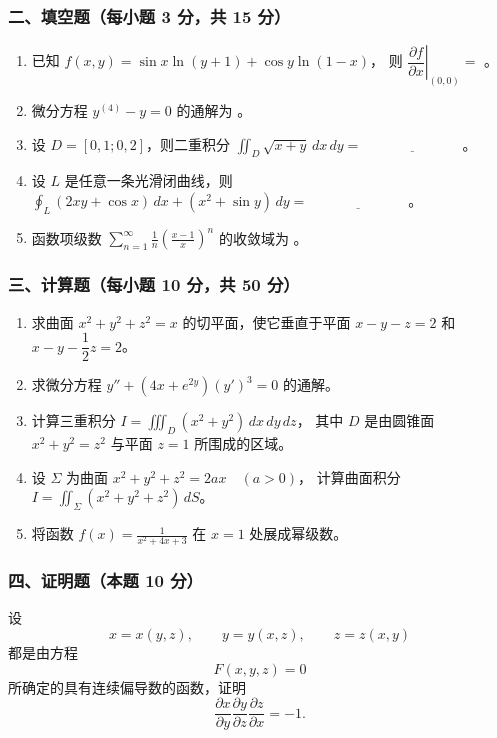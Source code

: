 \subsubsection*{二、填空题（每小题 3 分，共 15 分）}
\begin{enumerate}
  \item 已知 \(\displaystyle f(x,y)=\sin x\ln(y+1)+\cos y\ln(1-x)\)，
  则 $\left.\dfrac{\partial f}{\partial x}\right|_{(0,0)}=$ \underline{\hspace{3cm}}。
  \item 微分方程 \(\displaystyle y^{(4)}-y=0\)
  的通解为 \underline{\hspace{4cm}}。
  \item 设 $D=[0,1;0,2]$，则二重积分
  \(\displaystyle \iint_D\sqrt{x+y}\,dx\,dy=\underline{\hspace{3cm}}\)。
  \item 设 $L$ 是任意一条光滑闭曲线，则
  \(\displaystyle \oint_L(2xy+\cos x)\,dx+(x^2+\sin y)\,dy=\underline{\hspace{3cm}}\)。
  \item 函数项级数 \(\displaystyle \sum_{n=1}^{\infty}\frac1n\left(\frac{x-1}{x}\right)^n\)
  的收敛域为 \underline{\hspace{4cm}}。
\end{enumerate}

\subsubsection*{三、计算题（每小题 10 分，共 50 分）}
\begin{enumerate}
  \item 求曲面 \(\displaystyle x^2+y^2+z^2=x\)
  的切平面，使它垂直于平面 $x-y-z=2$ 和 $x-y-\dfrac12z=2$。
  \item 求微分方程 \(\displaystyle y''+(4x+e^{2y})(y')^3=0\)
  的通解。
  \item 计算三重积分 \(\displaystyle I=\iiint_D(x^2+y^2)\,dx\,dy\,dz\)，
  其中 $D$ 是由圆锥面 $x^2+y^2=z^2$ 与平面 $z=1$ 所围成的区域。
  \item 设 $\Sigma$ 为曲面 \(\displaystyle x^2+y^2+z^2=2ax\quad(a>0)\)，
  计算曲面积分 \(\displaystyle I=\iint_\Sigma(x^2+y^2+z^2)\,dS\)。
  \item 将函数 \(\displaystyle f(x)=\frac1{x^2+4x+3}\)
  在 $x=1$ 处展成幂级数。
\end{enumerate}

\subsubsection*{四、证明题（本题 10 分）}
设
\[
x=x(y,z),\qquad y=y(x,z),\qquad z=z(x,y)
\]
都是由方程
\[
F(x,y,z)=0
\]
所确定的具有连续偏导数的函数，证明
\[
\frac{\partial x}{\partial y}\frac{\partial y}{\partial z}\frac{\partial z}{\partial x}=-1.
\]

